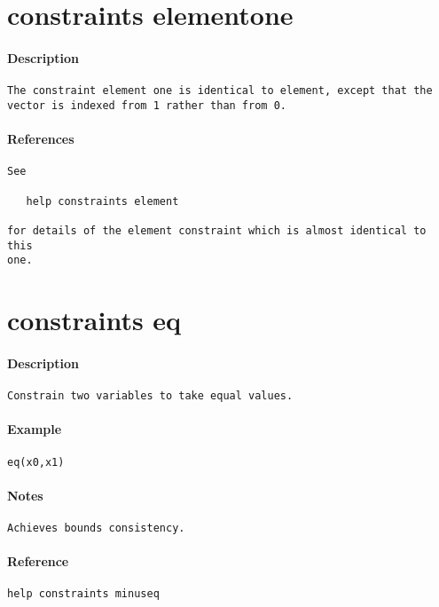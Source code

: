 \section{constraints element\textunderscore one}
\paragraph{Description}
{\footnotesize
\begin{verbatim}
The constraint element one is identical to element, except that the
vector is indexed from 1 rather than from 0.
\end{verbatim}
}
\paragraph{References}
{\footnotesize
\begin{verbatim}
See

   help constraints element

for details of the element constraint which is almost identical to this
one.
\end{verbatim}
}
\section{constraints eq}
\paragraph{Description}
{\footnotesize
\begin{verbatim}
Constrain two variables to take equal values.
\end{verbatim}
}
\paragraph{Example}
{\footnotesize
\begin{verbatim}
eq(x0,x1)
\end{verbatim}
}
\paragraph{Notes}
{\footnotesize
\begin{verbatim}
Achieves bounds consistency.
\end{verbatim}
}
\paragraph{Reference}
{\footnotesize
\begin{verbatim}
help constraints minuseq
\end{verbatim}
}
